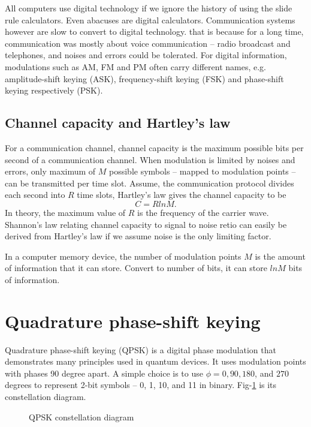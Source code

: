 \documentclass[Letter,11pt]{book}
\begin{document}
All computers use digital technology if we ignore the history of using the slide rule calculators. Even abacuses are digital calculators. Communication systems however are slow to convert to digital technology. that is because for a long time, communication was mostly about voice communication -- radio broadcast and telephones, and noises and errors could be tolerated. For digital information, modulations such as AM, FM and PM often carry different names, e.g. amplitude-shift keying (ASK), frequency-shift keying (FSK) and phase-shift keying respectively (PSK).

\subsection{Channel capacity and Hartley's law}
For a communication channel, channel capacity is the maximum possible bits per second of a communication channel. When modulation is limited by noises and errors, only maximum of $M$ possible symbols -- mapped to modulation points -- can be transmitted per time slot. Assume, the communication protocol divides each second into $R$ time slots, Hartley's law gives the channel capacity to be
\begin{equation}
    C = R ln M.
\end{equation}
In theory, the maximum value of $R$ is the frequency of the carrier wave. Shannon's law relating channel capacity to signal to noise retio can easily be derived from Hartley's law if we assume noise is the only limiting factor.

In a computer memory device, the number of modulation points $M$ is the amount of information that it can store. Convert to number of bits, it can store $ln M$ bits of information.

\section{Quadrature phase-shift keying}
Quadrature phase-shift keying (QPSK) is a digital phase modulation that demonstrates many principles used in quantum devices. It uses modulation points with phases 90 degree apart. A simple choice is to use $\phi = 0, 90, 180$, and $270$ degrees to represent 2-bit symbols -- 0, 1, 10, and 11 in binary. Fig-\ref{QPSK} is its constellation diagram.

\begin{figure}[ht]
\caption{QPSK constellation diagram}
\label{QPSK}
\end{figure}
\end{document}
